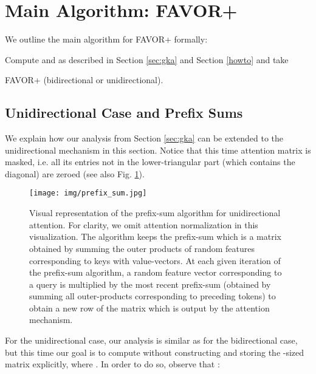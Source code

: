\section{Main Algorithm: FAVOR+}
\label{appendix:main_algorithm}
We outline the main algorithm for FAVOR+ formally: 

\begin{algorithm}[h]
\SetAlgoLined
{}
Compute  and  as described in Section \ref{sec:gka} and Section \ref{howto} and take \;
\;
\Return \;
\caption{FAVOR+ (bidirectional or unidirectional).}
\label{alg:1}
\end{algorithm}


\subsection{Unidirectional Case and Prefix Sums}
\label{subsec:unidirectional}
We explain how our analysis from Section \ref{sec:gka} can be extended to the unidirectional mechanism in this section.
Notice that this time attention matrix  is masked, i.e. all its entries not in the lower-triangular part (which contains the diagonal) are zeroed (see also Fig. \ref{fig:prefix_sum}).

\begin{figure}[h]
  \centering
  \texttt{[image: img/prefix\_sum.jpg]}
  \caption{\small{Visual representation of the prefix-sum algorithm for unidirectional attention. For clarity, we omit attention normalization in this visualization. The algorithm keeps the prefix-sum which is a matrix obtained by summing the outer products of random features corresponding to keys with value-vectors. At each given iteration of the prefix-sum algorithm, a random feature vector corresponding to a query is multiplied by the most recent prefix-sum (obtained by summing all outer-products corresponding to preceding tokens) to obtain a new row of the matrix  which is output by the attention mechanism.\\}}
  \label{fig:prefix_sum}
\end{figure}

For the unidirectional case, our analysis is similar as for the bidirectional case, but this time our goal is to compute  without constructing and storing the -sized matrix  explicitly, where
. In order to do so, observe that :

